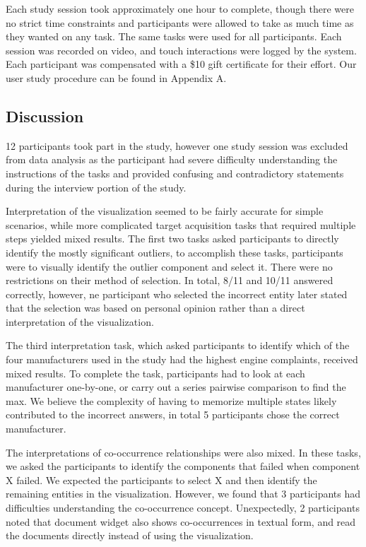 Each study session took approximately one hour to complete, though there were no
strict time constraints and participants were allowed to take as much time as
they wanted on any task. The same tasks were used for all
participants. Each session was recorded on video, and touch interactions were
logged by the system. Each participant was compensated with a \$10 gift
certificate for their effort. Our user study procedure can be found in Appendix
A.
 

\subsection{Discussion}
12 participants took part in the study, however one study session was excluded
from data analysis as the participant had severe difficulty understanding the
instructions of the tasks and provided confusing and contradictory statements
during the interview portion of the study.

Interpretation of the \threed visualization seemed to be fairly accurate for
simple scenarios, while more complicated target acquisition tasks that required
multiple steps yielded mixed results. The first two tasks asked
participants to directly identify the mostly significant outliers, to accomplish
these tasks, participants were to visually identify the outlier \threed
component and select it. There were no restrictions on their method of
selection. In total, 8/11 and 10/11 answered correctly, however, ne participant
who selected the incorrect entity later stated that the selection was based on
personal opinion rather than a direct interpretation of the visualization.

The third interpretation task, which asked participants to identify which of the four
manufacturers used in the study had the highest engine complaints, received
mixed results. To complete the task, participants had to look at each
manufacturer one-by-one, or carry out a series pairwise comparison to find the
max. We believe the complexity of having to memorize multiple states likely
contributed to the incorrect answers, in total 5 participants chose the correct
manufacturer. 

The interpretations of co-occurrence relationships were also mixed. In these
tasks, we asked the participants to identify the components that failed when
component X failed. We expected the participants to select X and then identify
the remaining entities in the visualization. However, we found that 3 participants
had difficulties understanding the co-occurrence concept. Unexpectedly, 2
participants noted that document widget also shows co-occurrences in textual
form, and read the documents directly instead of using the \threed
visualization.

